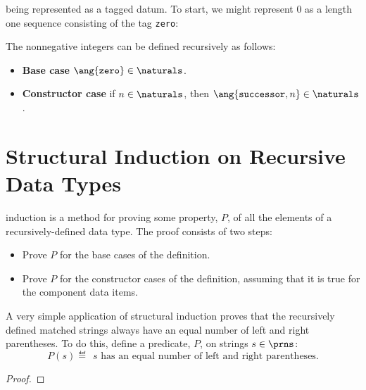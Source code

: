  being represented as
a tagged datum.  To start, we might represent 0 as a length one sequence
consisting of the tag \texttt{zero}:
\begin{definition}
The nonnegative integers can be defined recursively as follows:

\begin{definition}\label{tagn}
\begin{itemize}
\item \textbf{Base case}  $\ang{\texttt{zero}}\in \naturals$.
\item \textbf{Constructor case} if $n \in \naturals$, then
      $\ang{\texttt{successor},n}\in \naturals$.
\end{itemize}

\end{definition}
\fi

\section{Structural Induction on Recursive Data Types}

 induction is a method for proving
some property, $P$, of all the elements of a recursively-defined data
type.  The proof consists of two steps:
\begin{itemize}
\item Prove $P$ for the base cases of the definition. 
\item Prove $P$ for the constructor cases of the definition, assuming that it
  is true for the component data items.  
\end{itemize}

A very simple application of structural induction proves that the
recursively defined matched strings always have an equal number of left
and right parentheses.  To do this, define a predicate, $P$, on strings $s
\in \prns$:
\[
P(s) \eqdef\ \ s \text{ has an equal number of left and right parentheses}.
\]
\begin{proof}


\end{proof}
\end{definition}
